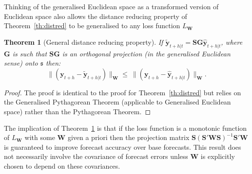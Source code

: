 \documentclass[12pt]{article}
\newtheorem{theo}{Theorem}[section]
\theoremstyle{definition}
\begin{document}

Thinking of the generalised Euclidean space as a transformed version of Euclidean space also allows the distance reducing property of Theorem~\ref{th:distred} to be generalised to any loss function $L_{\bm{W}}$

\begin{theo}[General distance reducing property]\label{th:gdistred}
  If $\tilde{\bm{y}}_{t+h|t}=\bm{S}\bm{G}\hat{\bm{y}}_{t+h|t}$, where $\bm{G}$ is such that $\bm{S}\bm{G}$ is an orthogonal projection (in the generalised Euclidean sense) onto $\mathfrak{s}$ then:
  \begin{equation*}
    \|(\bm{y}_{t+h}-\tilde{\bm{y}}_{t+h|t})\|_{\bm{W}}
      \le\
    \|(\bm{y}_{t+h}-\hat{\bm{y}}_{t+h|t})\|_{\bm{W}}.
  \end{equation*}
\end{theo}
\begin{proof}
  The proof is identical to the proof for Theorem~\ref{th:distred} but relies on the Generalised Pythagorean Theorem (applicable to Generalised Euclidean space) rather than the Pythagorean Theorem.
  \end{proof}

The implication of Theorem~\ref{th:gdistred} is that if the loss function is a monotonic function of $L_{\bm{W}}$ {\color{blue} with some $\bm{W}$ given a priori} then the projection matrix $\bm{S}(\bm{S}'\bm{W}\bm{S})^{-1}\bm{S}'\bm{W}$ is guaranteed to improve forecast accuracy over base forecasts.  {\color{blue}  This result does not necessarily involve the covariance of forecast errors unless $\bm{W}$ is explicitly chosen to depend on these covariances.}
\end{document}
